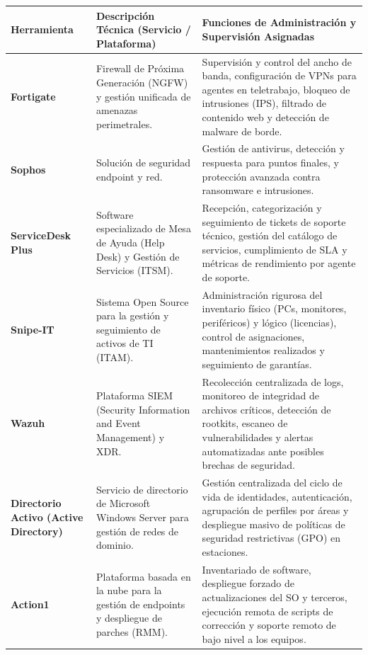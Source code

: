 	\vspace{0.5cm}
	\noindent
	\begin{tabularx}{\textwidth}{|p{3.5cm}|X|X|}
		\hline
		\textbf{Herramienta} & \textbf{Descripción Técnica (Servicio / Plataforma)} & \textbf{Funciones de Administración y Supervisión Asignadas} \\ \hline
		\textbf{Fortigate} & Firewall de Próxima Generación (NGFW) y gestión unificada de amenazas perimetrales. & Supervisión y control del ancho de banda, configuración de VPNs para agentes en teletrabajo, bloqueo de intrusiones (IPS), filtrado de contenido web y detección de malware de borde. \\ \hline
		\textbf{Sophos} & Solución de seguridad endpoint y red. & Gestión de antivirus, detección y respuesta para puntos finales, y protección avanzada contra ransomware e intrusiones. \\ \hline
		\textbf{ServiceDesk Plus} & Software especializado de Mesa de Ayuda (Help Desk) y Gestión de Servicios (ITSM). & Recepción, categorización y seguimiento de tickets de soporte técnico, gestión del catálogo de servicios, cumplimiento de SLA y métricas de rendimiento por agente de soporte. \\ \hline
		\textbf{Snipe-IT} & Sistema Open Source para la gestión y seguimiento de activos de TI (ITAM). & Administración rigurosa del inventario físico (PCs, monitores, periféricos) y lógico (licencias), control de asignaciones, mantenimientos realizados y seguimiento de garantías. \\ \hline
		\textbf{Wazuh} & Plataforma SIEM (Security Information and Event Management) y XDR. & Recolección centralizada de logs, monitoreo de integridad de archivos críticos, detección de rootkits, escaneo de vulnerabilidades y alertas automatizadas ante posibles brechas de seguridad. \\ \hline
		\textbf{Directorio Activo (Active Directory)} & Servicio de directorio de Microsoft Windows Server para gestión de redes de dominio. & Gestión centralizada del ciclo de vida de identidades, autenticación, agrupación de perfiles por áreas y despliegue masivo de políticas de seguridad restrictivas (GPO) en estaciones. \\ \hline
		\textbf{Action1} & Plataforma basada en la nube para la gestión de endpoints y despliegue de parches (RMM). & Inventariado de software, despliegue forzado de actualizaciones del SO y terceros, ejecución remota de scripts de corrección y soporte remoto de bajo nivel a los equipos. \\ \hline

\end{tabularx}
